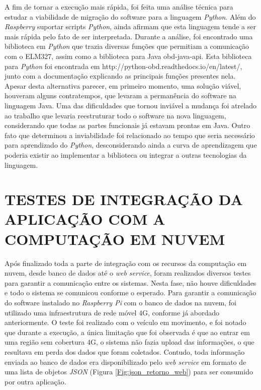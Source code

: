 A fim de tornar a execução mais rápida, foi feita uma análise técnica para estudar a viabilidade de migração do software para a linguagem \textit{Python}. Além do \textit{Raspberry} suportar scripts \textit{Python},  ainda afirmam que esta linguagem tende a ser mais rápida pelo fato de ser interpretada. Durante a análise, foi encontrado uma biblioteca em \textit{Python} que trazia diversas funções que permitiam a comunicação com o ELM327, assim como a biblioteca para Java obd-java-api. Esta biblioteca para \textit{Python} foi encontrada em http://python-obd.readthedocs.io/en/latest/, junto com a documentação explicando as principais funções presentes nela. Apesar desta alternativa parecer, em primeiro momento, uma solução viável, houveram alguns contratempos, que levaram a permanência do software na linguagem Java. Uma das dificuldades que tornou inviável a mudança foi atrelado ao trabalho que levaria reestruturar todo o software na nova linguagem, considerando que todas as partes funcionais já estavam prontas em Java. Outro fato que determinou a inviabilidade foi relacionado ao tempo que seria necessário para aprendizado do \textit{Python}, desconsiderando ainda a curva de aprendizagem que poderia existir ao implementar a biblioteca ou integrar a outras tecnologias da linguagem.

\section{TESTES DE INTEGRAÇÃO DA APLICAÇÃO COM A COMPUTAÇÃO EM NUVEM}
Após finalizado toda a parte de integração com os recursos da computação em nuvem, desde banco de dados até o \textit{web service}, foram realizados diversos testes para garantir a comunicação entre os sistemas. Nesta fase, não houve dificuldades e todo o sistema se comunicou conforme o esperado. Para garantir a comunicação do software instalado no \textit{Raspberry Pi} com o banco de dados na nuvem, foi utilizado uma infraestrutura de rede móvel 4G, conforme já abordado anteriormente. O teste foi realizado com o veículo em movimento, e foi notado que durante a execução, a única limitação que foi observada é que ao entrar em uma região sem cobertura 4G, o sistema não fazia upload das informações, o que resultava em perda dos dados que foram coletados. Contudo, toda informação enviada ao banco de dados era disponibilizado pelo \textit{web service} em formato de uma lista de objetos \textit{JSON} (Figura \ref{Fig:json_retorno_web}) para ser consumido por outra aplicação.

